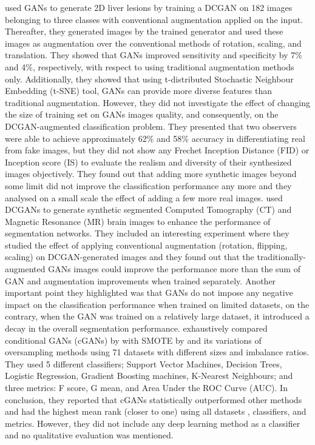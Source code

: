 \documentclass[final,3p,twocolumn,authoryear,sort&compress,times]{maia}
\begin{document}
\citet{liver_aug} used GANs to generate 2D liver lesions by training a DCGAN on 182 images belonging to three classes with conventional augmentation applied on the input. Thereafter, they generated images by the trained generator and used these images as augmentation over the conventional methods of rotation, scaling, and translation. They showed that GANs improved sensitivity and specificity by 7\% and 4\%, respectively, with respect to using traditional augmentation methods only. Additionally, they showed that using t-distributed Stochastic Neighbour Embedding (t-SNE) tool, GANs can provide more diverse features than traditional augmentation. However, they did not investigate the effect of changing the size of training set on GANs images quality, and consequently, on the DCGAN-augmented classification problem. They presented that two observers were able to achieve approximately 62\% and 58\% accuracy in differentiating real from fake images, but they did not show any Frechet Inception Distance (FID) or Inception score (IS) to evaluate the realism and diversity of their synthesized images objectively. They found out that adding more synthetic images beyond some limit did not improve the classification performance any more and they analysed on a small scale the effect of adding a few more real images. \citet{GAN_brain_aug} used DCGANs to generate synthetic segmented Computed Tomography (CT) and Magnetic Resonance (MR) brain images to enhance the performance of segmentation networks. They included an interesting experiment where they studied the effect of applying conventional augmentation (rotation, flipping, scaling) on DCGAN-generated images and they found out that the traditionally-augmented GANs images could improve the performance more than the sum of GAN and augmentation improvements when trained separately. Another important point they highlighted was that GANs do not impose any negative impact on the classification performance when trained on limited datasets, on the contrary, when the GAN was trained on a relatively large dataset, it introduced a decay in the overall segmentation performance.
\cite{imb_learn_Portu} exhaustively compared conditional GANs (cGANs) by \citet{cGAN} with SMOTE by \citet{SMOTE} and its variations of oversampling methods using 71 datasets with different sizes and imbalance ratios. They used 5 different classifiers; Support Vector Machines, Decision Trees, Logistic Regression, Gradient Boosting machines, K-Nearest Neighbours; and three metrics: F score, G mean, and Area Under the ROC Curve (AUC). In conclusion, they reported that cGANs statistically outperformed other methods and had the highest mean rank (closer to one) using all datasets , classifiers, and metrics. However, they did not include any deep learning method as a classifier and no qualitative evaluation was mentioned.
\end{document}
